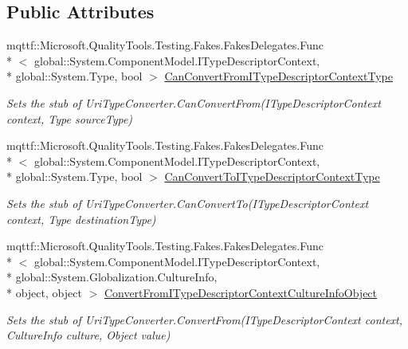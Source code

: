 \subsection*{Public Attributes}
\begin{DoxyCompactItemize}
\item 
mqttf\-::\-Microsoft.\-Quality\-Tools.\-Testing.\-Fakes.\-Fakes\-Delegates.\-Func\\*
$<$ global\-::\-System.\-Component\-Model.\-I\-Type\-Descriptor\-Context, \\*
global\-::\-System.\-Type, bool $>$ \hyperlink{class_system_1_1_fakes_1_1_stub_uri_type_converter_a52107da1e6d23bce0e8a496f8e19a4a2}{Can\-Convert\-From\-I\-Type\-Descriptor\-Context\-Type}
\begin{DoxyCompactList}\small\item\em Sets the stub of Uri\-Type\-Converter.\-Can\-Convert\-From(\-I\-Type\-Descriptor\-Context context, Type source\-Type)\end{DoxyCompactList}\item 
mqttf\-::\-Microsoft.\-Quality\-Tools.\-Testing.\-Fakes.\-Fakes\-Delegates.\-Func\\*
$<$ global\-::\-System.\-Component\-Model.\-I\-Type\-Descriptor\-Context, \\*
global\-::\-System.\-Type, bool $>$ \hyperlink{class_system_1_1_fakes_1_1_stub_uri_type_converter_a5efd90f7062cc07a37a0443179ce13e3}{Can\-Convert\-To\-I\-Type\-Descriptor\-Context\-Type}
\begin{DoxyCompactList}\small\item\em Sets the stub of Uri\-Type\-Converter.\-Can\-Convert\-To(\-I\-Type\-Descriptor\-Context context, Type destination\-Type)\end{DoxyCompactList}\item 
mqttf\-::\-Microsoft.\-Quality\-Tools.\-Testing.\-Fakes.\-Fakes\-Delegates.\-Func\\*
$<$ global\-::\-System.\-Component\-Model.\-I\-Type\-Descriptor\-Context, \\*
global\-::\-System.\-Globalization.\-Culture\-Info, \\*
object, object $>$ \hyperlink{class_system_1_1_fakes_1_1_stub_uri_type_converter_ace07103708dc7ebb6223eff888d1799f}{Convert\-From\-I\-Type\-Descriptor\-Context\-Culture\-Info\-Object}
\begin{DoxyCompactList}\small\item\em Sets the stub of Uri\-Type\-Converter.\-Convert\-From(\-I\-Type\-Descriptor\-Context context, Culture\-Info culture, Object value)\end{DoxyCompactList}\item 

\end{DoxyCompactItemize}
